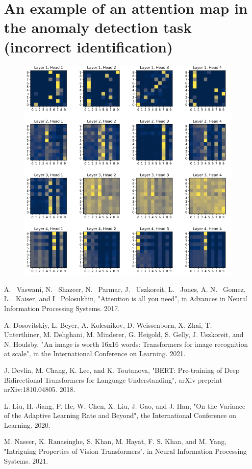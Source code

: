 \documentclass[peerreview]{IEEEtran}
\begin{document}
\section{An example of an attention map in the anomaly detection task (incorrect identification)} \label{App:anomaly_attention_map_incorrect}
\begin{figure}[!h]
\centering
\includegraphics[width=1\columnwidth]{anomaly_attention_map_incorrect.png} 
\label{anomaly_attention_map_incorrect}
\end{figure}

\begin{thebibliography}{1}

A. ~Vaswani, N. ~Shazeer, N. ~Parmar, J. ~Uszkoreit, L. ~Jones, A. N. ~Gomez, Ł. ~Kaiser, and I ~Polosukhin, "Attention is all you need", in Advances in Neural Information Processing Systems. 2017.

A. Dosovitskiy, L. Beyer, A. Kolesnikov, D. Weissenborn, X. Zhai, T. Unterthiner, M. Dehghani, M. Minderer, G. Heigold, S. Gelly, J. Uszkoreit, and N. Houlsby, "An image is worth 16x16 words: Transformers for image recognition at scale", in the International Conference on Learning. 2021.

J. Devlin, M. Chang, K. Lee, and K. Toutanova, "BERT: Pre-training of Deep Bidirectional Transformers for Language Understanding", arXiv preprint arXiv:1810.04805. 2018. 

L. Liu, H. Jiang, P. He, W. Chen, X. Liu, J. Gao, and J. Han, "On the Variance of the Adaptive Learning
Rate and Beyond", the International Conference on Learning. 2020. 

M. Naseer, K. Ranasinghe, S. Khan,
M. Hayat, F. S. Khan, and M. Yang, "Intriguing Properties of Vision Transformers", in Neural Information Processing Systems. 2021.
\end{thebibliography}
\end{document}
